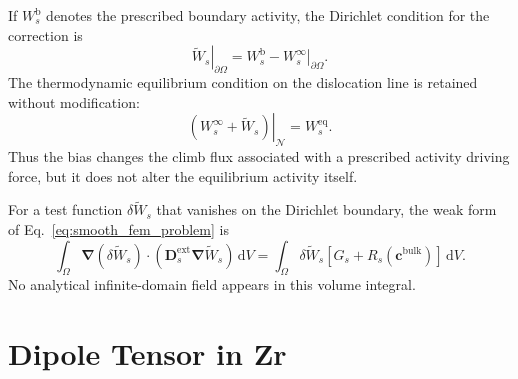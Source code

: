 \documentclass[10pt]{article}
\begin{document}
If $W_s^{\mathrm b}$ denotes the prescribed boundary activity, the Dirichlet
condition for the correction is
\begin{equation}
    \left.\widetilde W_s\right|_{\partial\Omega}
    =
    W_s^{\mathrm b}
    -
    \left.W_s^\infty\right|_{\partial\Omega}.
    \label{eq:theory_dirichlet_split}
\end{equation}
The thermodynamic equilibrium condition on the dislocation line is retained
without modification:
\begin{equation}
    \left.
    \left(
    W_s^\infty+\widetilde W_s
    \right)
    \right|_{\mathcal N}
    =
    W_s^{\mathrm{eq}}.
    \label{eq:theory_dislocation_equilibrium}
\end{equation}
Thus the bias changes the climb flux associated with a prescribed activity
driving force, but it does not alter the equilibrium activity itself.

For a test function $\delta\widetilde W_s$ that vanishes on the Dirichlet
boundary, the weak form of Eq.~\eqref{eq:smooth_fem_problem} is
\begin{equation}
    \int_\Omega
    \bm\nabla(\delta\widetilde W_s)
    \cdot
    \left(
    \bm D_s^{\mathrm{ext}}\bm\nabla\widetilde W_s
    \right)
    \,\mathrm dV
    =
    \int_\Omega
    \delta\widetilde W_s
    \left[
    G_s+R_s(\bm c^{\mathrm{bulk}})
    \right]
    \,\mathrm dV.
    \label{eq:smooth_fem_weak_form}
\end{equation}
No analytical infinite-domain field appears in this volume integral.

\section{Dipole Tensor in Zr}
\end{document}
